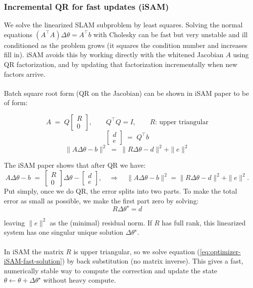 \subsubsection{Incremental QR for fast updates (iSAM)}
We solve the linearized SLAM subproblem by least squares. Solving the normal equations $(A^\top A)\Delta\theta = A^\top b$ with Cholesky can be fast but very unstable and ill conditioned as the problem grows (it squares the condition number and increases fill in). iSAM avoids this by working directly with the whitened Jacobian $A$ using QR factorization, and by updating that factorization incrementally when new factors arrive.
\\ \\
Batch square root form (QR on the Jacobian) can be shown in iSAM paper \cite{iSAM_paper} to be of form:

$$
    A \;=\; Q
    \begin{bmatrix}
    R\\[2pt]
    0
    \end{bmatrix},
    \qquad Q^\top Q = I,
    \qquad R \text{: upper triangular}
$$
$$
    \begin{bmatrix}
    d\\ e
    \end{bmatrix}
    \;=\;
    Q^\top b
$$
$$
    \|A\Delta\theta - b\|^2
    \;=\;
    \|R\Delta\theta - d\|^2 + \|e\|^2
$$

\noindent
The iSAM paper \cite{iSAM_paper} shows that after QR we have:
$$
    A\Delta\theta - b \;=\;
    \begin{bmatrix} R \\ 0 \end{bmatrix}\Delta\theta -
    \begin{bmatrix} d \\ e \end{bmatrix},
    \quad\Rightarrow\quad
    \|A\Delta\theta - b\|^2 = \|R\Delta\theta - d\|^2 + \|e\|^2.
$$
\noindent
Put simply, once we do QR, the error splits into two parts. To make the total error as small as possible, we make the first part zero by solving:
\begin{equation}
    R\Delta\theta^\star = d
    \label{eq:optimizer-iSAM-fast-solution}
\end{equation}

\noindent
leaving $\|e\|^2$ as the (minimal) residual norm. If $R$ has full rank, this linearized system has one singular unique solution $\Delta\theta^\star$.
\\ \\
In iSAM the matrix $R$ is upper triangular, so we solve equation (\ref{eq:optimizer-iSAM-fast-solution}) by back substitution (no matrix inverse). This gives a fast, numerically stable way to compute the correction and update the state $\theta \leftarrow \theta + \Delta\theta^\star$ without heavy compute.



